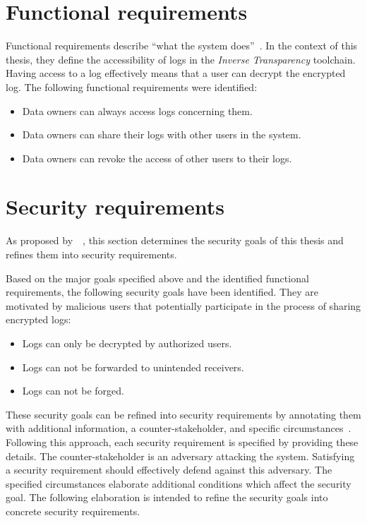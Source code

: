 \documentclass[../main.tex]{subfiles}
\begin{document}
\section{Functional requirements}\label{functional-requriements}
Functional requirements describe \enquote{what the system does}~\cite[11]{Mylopoulos1992}.
In the context of this thesis, they define the accessibility of logs in the \emph{Inverse Transparency} toolchain.
Having access to a log effectively means that a user can decrypt the encrypted log.
The following functional requirements were identified:
\begin{itemize}
    \item Data owners can always access logs concerning them.
    \item Data owners can share their logs with other users in the system.
    \item Data owners can revoke the access of other users to their logs.
\end{itemize}

\section{Security requirements}\label{security-requriements}
As proposed by~\citeauthor{Fabian2010}~\cite{Fabian2010}, this section determines the security goals of this thesis and refines them into security requirements.


Based on the major goals specified above and the identified functional requirements, the following security goals have been identified.
They are motivated by malicious users that potentially participate in the process of sharing encrypted logs:
\begin{itemize}
    \item Logs can only be decrypted by authorized users.
    \item Logs can not be forwarded to unintended receivers.
    \item Logs can not be forged.
  \end{itemize}

These security goals can be refined into security requirements by annotating them with additional information, a counter-stakeholder, and specific circumstances~\cite{Fabian2010}.
Following this approach, each security requirement is specified by providing these details.
The counter-stakeholder is an adversary attacking the system.
Satisfying a security requirement should effectively defend against this adversary.
The specified circumstances elaborate additional conditions which affect the security goal.
The following elaboration is intended to refine the security goals into concrete security requirements.
\end{document}
